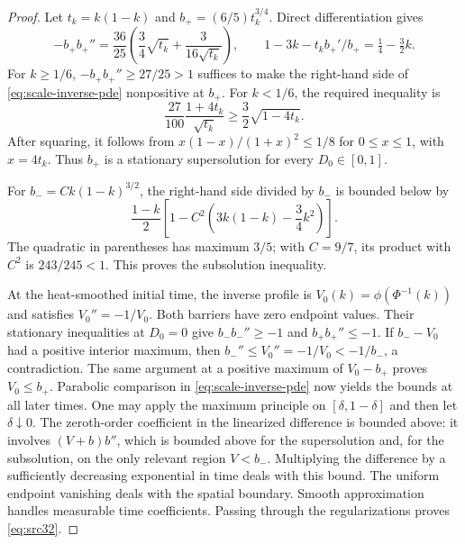 \documentclass[11pt,a4paper]{article}
\numberwithin{equation}{section}
\theoremstyle{definition}
\theoremstyle{remark}
\begin{document}
\begin{proof}
Let $t_k=k(1-k)$ and $b_+=(6/5)t_k^{3/4}$. Direct differentiation gives
\[
 -b_+b_+''=\frac{36}{25}
       \left(\frac34\sqrt{t_k}+\frac{3}{16\sqrt{t_k}}\right),\qquad
 1-3k-t_k b_+' /b_+=\tfrac14-\tfrac32k.
\]
For $k\ge1/6$, $-b_+b_+''\ge27/25>1$ suffices to make the
right-hand side of \eqref{eq:scale-inverse-pde} nonpositive at $b_+$.
For $k<1/6$, the required inequality is
\[
 \frac{27}{100}\frac{1+4t_k}{\sqrt{t_k}}
 \ge\frac32\sqrt{1-4t_k}.
\]
After squaring, it follows from
$x(1-x)/(1+x)^2\le1/8$ for $0\le x\le1$, with $x=4t_k$.
Thus $b_+$ is a stationary supersolution for every $D_0\in[0,1]$.

For $b_-=Ck(1-k)^{3/2}$, the right-hand side divided by $b_-$ is
bounded below by
\[
 \frac{1-k}{2}
 \left[1-C^2\left(3k(1-k)-\frac34k^2\right)\right].
\]
The quadratic in parentheses has maximum $3/5$; with $C=9/7$,
its product with $C^2$ is $243/245<1$. This proves the subsolution
inequality.

At the heat-smoothed initial time, the inverse profile is
$V_0(k)=\phi(\Phi^{-1}(k))$ and satisfies $V_0''=-1/V_0$.
Both barriers have zero endpoint values. Their stationary inequalities
at $D_0=0$ give $b_-b_-''\ge-1$ and $b_+b_+''\le-1$.
If $b_--V_0$ had a positive interior maximum, then
$b_-''\le V_0''=-1/V_0<-1/b_-$, a contradiction.
The same argument at a positive maximum of $V_0-b_+$ proves
$V_0\le b_+$. Parabolic comparison in
\eqref{eq:scale-inverse-pde} now yields the bounds at all later times.
One may apply the maximum principle on $[\delta,1-\delta]$ and then
let $\delta\downarrow0$. The zeroth-order coefficient in the
linearized difference is bounded above: it involves
$(V+b)b''$, which is bounded above for the supersolution and, for the
subsolution, on the only relevant region $V<b_-$. Multiplying the
difference by a sufficiently decreasing exponential in time deals
with this bound. The uniform endpoint vanishing deals with the
spatial boundary. Smooth approximation handles measurable time
coefficients. Passing through the regularizations proves
\eqref{eq:src32}.
\end{proof}
\end{document}
